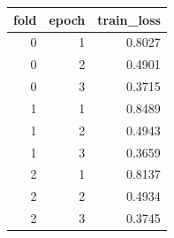 \begin{tabular}{rrr}
\toprule
fold & epoch & train\_loss \\
\midrule
0 & 1 & 0.8027 \\
0 & 2 & 0.4901 \\
0 & 3 & 0.3715 \\
1 & 1 & 0.8489 \\
1 & 2 & 0.4943 \\
1 & 3 & 0.3659 \\
2 & 1 & 0.8137 \\
2 & 2 & 0.4934 \\
2 & 3 & 0.3745 \\
\bottomrule
\end{tabular}
